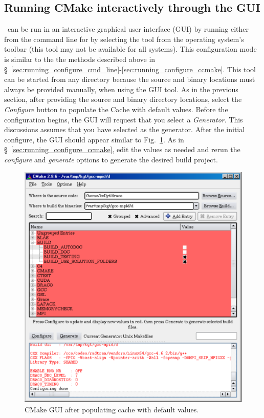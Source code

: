 \subsection{Running CMake interactively through the GUI}
\label{sec:running_configure_cmakegui}

\cmake\ can be run in an interactive graphical user interface (GUI) by running  either from the command line for by selecting the tool from the operating system's toolbar (this tool may not be available for all systems).  This configuration mode is similar to the the methods described above in \S~\ref{sec:running_configure_cmd_line}-\ref{sec:running_configure_ccmake}.  This tool can be started from any directory because the source and binary locations must always be provided manually, when using the GUI tool.  As in the previous section, after providing the source and binary directory locations, select the {\it Configure} button to populate the Cache with default values.  Before the configuration begins, the GUI will request that you select a {\it Generator}.  This discussions assumes that you have selected  as the generator.  After the initial configure, the GUI should appear similar to Fig.~\ref{fig:cmakegui_defaults}.  As in \S~\ref{sec:running_configure_ccmake}, edit the values as needed and rerun the {\it configure} and {\it generate} options to generate the desired build project.
%
\begin{figure}
  \centerline{\includegraphics[angle=0,width=5.5in]{fig/cmakegui_defaults}}
  \caption{CMake GUI after populating cache with default values.}
  \label{fig:cmakegui_defaults}
\end{figure}
%

